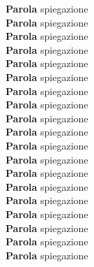 \noindent \textbf{Parola} spiegazione\\
\noindent \textbf{Parola} spiegazione\\
\noindent \textbf{Parola} spiegazione\\
\noindent \textbf{Parola} spiegazione\\
\noindent \textbf{Parola} spiegazione\\
\noindent \textbf{Parola} spiegazione\\
\noindent \textbf{Parola} spiegazione\\
\noindent \textbf{Parola} spiegazione\\
\noindent \textbf{Parola} spiegazione\\
\noindent \textbf{Parola} spiegazione\\
\noindent \textbf{Parola} spiegazione\\
\noindent \textbf{Parola} spiegazione\\
\noindent \textbf{Parola} spiegazione\\
\noindent \textbf{Parola} spiegazione\\
\noindent \textbf{Parola} spiegazione\\
\noindent \textbf{Parola} spiegazione\\
\noindent \textbf{Parola} spiegazione\\
\noindent \textbf{Parola} spiegazione\\
\noindent \textbf{Parola} spiegazione\\

